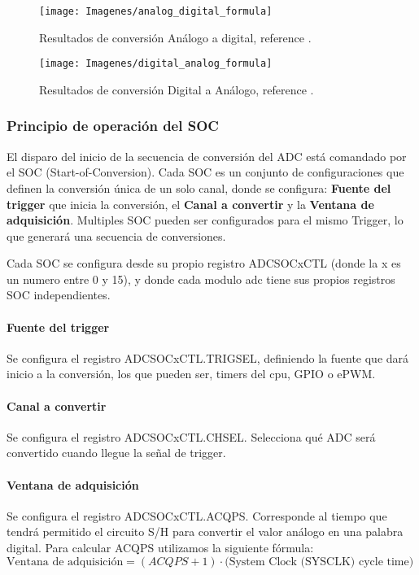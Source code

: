 \begin{figure}[h]
	\centering
	\texttt{[image: Imagenes/analog\_digital\_formula]}
	\caption{Resultados de conversión Análogo a digital, reference \cite[page 1557]{tmr}.}
	\label{fig:2}
\end{figure}


\begin{figure}[h]
	\centering
	\texttt{[image: Imagenes/digital\_analog\_formula]}
	\caption{Resultados de conversión Digital a Análogo, reference \cite[page 1557]{tmr}.}
	\label{fig:3}
\end{figure}

\subsubsection{Principio de operación del SOC}
El disparo del inicio de la secuencia de conversión del ADC está comandado por el SOC (Start-of-Conversion). Cada SOC es un conjunto de configuraciones que definen la conversión única de un solo canal, donde se configura: \textbf{Fuente del trigger} que inicia la conversión, el \textbf{Canal a convertir} y la \textbf{Ventana de adquisición}. Multiples SOC pueden ser configurados para el mismo Trigger, lo que generará una secuencia de conversiones.\par
Cada SOC se configura desde su propio registro ADCSOCxCTL (donde la x es un numero entre 0 y 15), y donde cada modulo adc tiene sus propios registros SOC independientes.

\paragraph{Fuente del trigger}
Se configura el registro ADCSOCxCTL.TRIGSEL, definiendo la fuente que dará inicio a la conversión, los que pueden ser, timers del cpu, GPIO o ePWM.
\paragraph{Canal a convertir}
Se configura el registro ADCSOCxCTL.CHSEL.
Selecciona qué ADC será convertido cuando llegue la señal de trigger.
\paragraph{Ventana de adquisición}
Se configura el registro ADCSOCxCTL.ACQPS.
Corresponde al tiempo que tendrá permitido el circuito S/H para convertir el valor análogo en una palabra digital.
Para calcular ACQPS utilizamos la siguiente fórmula:\\
$\text{Ventana de adquisición} = (ACQPS + 1)\cdot(\text{System Clock (SYSCLK) cycle time)}$

